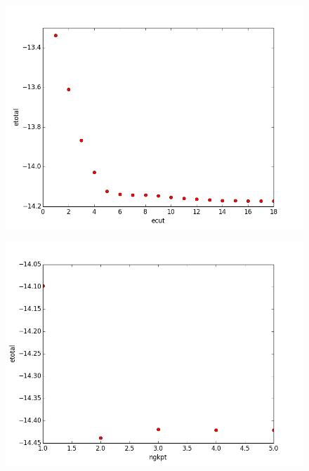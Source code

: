 \documentclass[11pt]{article}
\begin{document}
\begin{figure}
  \includegraphics{../figures/ecut_conv.png}
\end{figure}

\begin{figure}
  \includegraphics{../figures/ngkpt_conv.png}
\end{figure}




\end{document}
